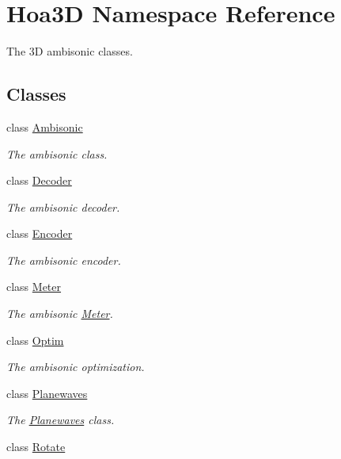 \hypertarget{namespace_hoa3_d}{\section{Hoa3\-D Namespace Reference}
\label{namespace_hoa3_d}
}


The 3\-D ambisonic classes.  


\subsection*{Classes}
\begin{DoxyCompactItemize}
\item 
class \hyperlink{class_hoa3_d_1_1_ambisonic}{Ambisonic}
\begin{DoxyCompactList}\small\item\em The ambisonic class. \end{DoxyCompactList}\item 
class \hyperlink{class_hoa3_d_1_1_decoder}{Decoder}
\begin{DoxyCompactList}\small\item\em The ambisonic decoder. \end{DoxyCompactList}\item 
class \hyperlink{class_hoa3_d_1_1_encoder}{Encoder}
\begin{DoxyCompactList}\small\item\em The ambisonic encoder. \end{DoxyCompactList}\item 
class \hyperlink{class_hoa3_d_1_1_meter}{Meter}
\begin{DoxyCompactList}\small\item\em The ambisonic \hyperlink{class_hoa3_d_1_1_meter}{Meter}. \end{DoxyCompactList}\item 
class \hyperlink{class_hoa3_d_1_1_optim}{Optim}
\begin{DoxyCompactList}\small\item\em The ambisonic optimization. \end{DoxyCompactList}\item 
class \hyperlink{class_hoa3_d_1_1_planewaves}{Planewaves}
\begin{DoxyCompactList}\small\item\em The \hyperlink{class_hoa3_d_1_1_planewaves}{Planewaves} class. \end{DoxyCompactList}\item 
class \hyperlink{class_hoa3_d_1_1_rotate}{Rotate}

\end{DoxyCompactItemize}
